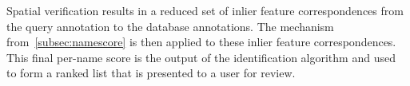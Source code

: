         Spatial verification results in a reduced set of inlier feature
          correspondences from the query annotation to the database
          annotations.
        The \namescoring{} mechanism from~\cref{subsec:namescore} is
          then applied to these inlier feature correspondences.
        This final per-name score is the output of the identification
          algorithm and used to form a ranked list that is presented to a
          user for review.

     \sver{}
